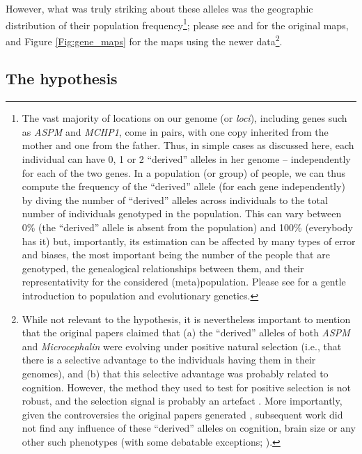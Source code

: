 \documentclass[twoside,onecolumn]{article}
\begin{document}
However, what was truly striking about these alleles was the geographic distribution of their population frequency\footnote{The vast majority of locations on our genome (or \emph{loci}), including genes such as \textit{ASPM} and \textit{MCHP1}, come in pairs, with one copy inherited from the mother and one from the father. Thus, in simple cases as discussed here, each individual can have 0, 1 or 2 ``derived'' alleles in her genome -- independently for each of the two genes. In a population (or group) of people, we can thus compute the frequency of the ``derived'' allele (for each gene independently) by diving the number of ``derived'' alleles across individuals to the total number of individuals genotyped in the population. This can vary between 0\% (the ``derived'' allele is absent from the population) and 100\% (everybody has it) but, importantly, its estimation can be affected by many types of error and biases, the most important being the number of the people that are genotyped, the genealogical relationships between them, and their representativity for the considered (meta)population. Please see \citet{jobling_human_2013} for a gentle introduction to population and evolutionary genetics.}; please see \citet[Fig. 1., p. 1721]{mekelbobrov_aspm_2005} and \citet[Fig. 3., p. 1719]{evans_microcephalin_2005} for the original maps, and Figure \ref{Fig:gene_maps} for the maps using the newer data\footnote{While not relevant to the \citet{dediu_ladd_2007} hypothesis, it is nevertheless important to mention that the original papers claimed that (a) the ``derived'' alleles of both \textit{ASPM} and \textit{Microcephalin} were evolving under positive natural selection (i.e., that there is a selective advantage to the individuals having them in their genomes), and (b) that this selective advantage was probably related to cognition. However, the method they used to test for positive selection is not robust, and the selection signal is probably an artefact \citep{currat_comment_2006,timpson_comment_2007}. More importantly, given the controversies the original papers generated \citep{saini_superior_2019}, subsequent work did not find any influence of these ``derived'' alleles on cognition, brain size or any other such phenotypes \citep{mekelbobrov_noselection_2007,rushton_noevidence_2007} (with some debatable exceptions; \citealp{woodley_relationship_2014,frost_aspmwriting_2008}).}.

\subsection{The hypothesis}
\end{document}
